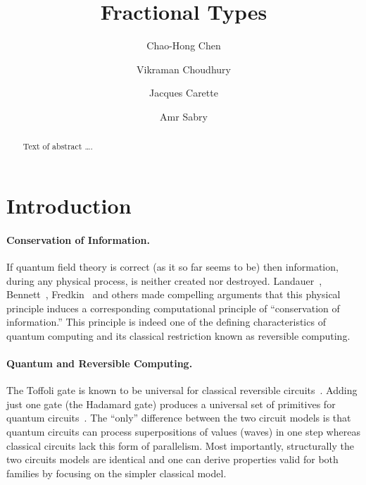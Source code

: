 \documentclass[sigplan,10pt,review,anonymous]{acmart}
\begin{document}
\title{Fractional Types}
\author{Chao-Hong Chen}

\author{Vikraman Choudhury}

\author{Jacques Carette}

\author{Amr Sabry}

\begin{abstract}
Text of abstract \ldots.
\end{abstract}

\maketitle

\section{Introduction}

\paragraph*{Conservation of Information.} If quantum field theory is
correct (as it so far seems to be) then information, during any
physical process, is neither created nor
destroyed. Landauer~\cite{Landauer:1961,Landauer,bennett1985fundamental},
Bennett~\cite{bennett2010notes,bennett2003notes,Bennett:1973:LRC},
Fredkin~\cite{fredkin1982conservative} and others made compelling
arguments that this physical principle induces a corresponding
computational principle of ``conservation of information.'' This
principle is indeed one of the defining characteristics of quantum
computing and its classical restriction known as reversible computing.

\paragraph*{Quantum and Reversible Computing.} The Toffoli gate is
known to be universal for classical reversible
circuits~\cite{Toffoli:1980}. Adding just one gate (the Hadamard gate)
produces a universal set of primitives for quantum
circuits~\cite{hadtoffuniv}. The ``only'' difference between the two
circuit models is that quantum circuits can process superpositions of
values (waves) in one step whereas classical circuits lack this form
of parallelism. Most importantly, structurally the two circuits models
are identical and one can derive properties valid for both families by
focusing on the simpler classical model.
\end{document}
